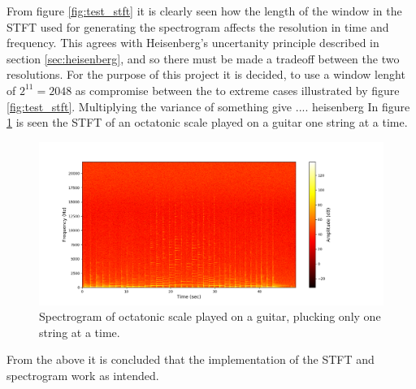 From figure \ref{fig:test_stft} it is clearly seen how the length of the window in the STFT used for generating the spectrogram affects the resolution in time and frequency. This agrees with Heisenberg's uncertanity principle described in section \ref{sec:heisenberg}, and so there must be made a tradeoff between the two resolutions. For the purpose of this project it is decided, to use a window lenght of $2^{11}=2048$ as compromise between the to extreme cases illustrated by figure \ref{fig:test_stft}. Multiplying the variance of something give .... heisenberg   In figure \ref{fig:STFT_test_signal} is seen the STFT of an octatonic scale played on a guitar one string at a time.
\begin{figure}[H]
\centering
\includegraphics[width=\textwidth]{figures/validation/stft/scale.png}
\caption{Spectrogram of octatonic scale played on a guitar, plucking only one string at a time.}
\label{fig:STFT_test_signal}
\end{figure}
From the above it is concluded that the implementation of the STFT and spectrogram work as intended.
